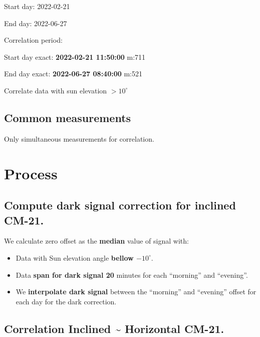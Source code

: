\documentclass[
  10pt,
  a4paper,oneside]{article}
\providecommand{\tightlist}{%
  \setlength{\itemsep}{0pt}\setlength{\parskip}{0pt}}
\begin{document}
Start day: 2022-02-21

End day: 2022-06-27

Correlation period:

Start day exact: \textbf{2022-02-21 11:50:00} m:711

End day exact: \textbf{2022-06-27 08:40:00} m:521

Correlate data with sun elevation \textbf{\(>10^\circ\)}

\hypertarget{common-measurements}{%
\subsection{Common measurements}\label{common-measurements}}

Only simultaneous measurements for correlation.

\hypertarget{process}{%
\section{Process}\label{process}}

\hypertarget{compute-dark-signal-correction-for-inclined-cm-21.}{%
\subsection{Compute dark signal correction for inclined CM-21.}\label{compute-dark-signal-correction-for-inclined-cm-21.}}

We calculate zero offset as the \textbf{median} value of signal with:

\begin{itemize}
\tightlist
\item
  Data with Sun elevation angle \textbf{bellow \(-10^\circ\)}.
\item
  Data \textbf{span for dark signal 20} minutes for each ``morning'' and ``evening''.
\item
  We \textbf{interpolate dark signal} between the ``morning'' and ``evening'' offset for each day for the dark correction.
\end{itemize}

\newpage

\hypertarget{correlation-inclined-horizontal-cm-21.}{%
\subsection{Correlation Inclined \textasciitilde{} Horizontal CM-21.}\label{correlation-inclined-horizontal-cm-21.}}
\end{document}
